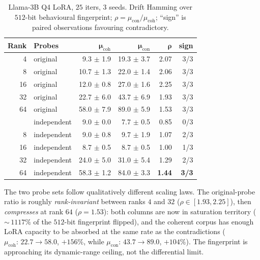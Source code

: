 \documentclass[11pt,a4paper]{article}
\begin{document}
\begin{table}[h]
\centering
\small
\caption{Llama\nobreakdash-3B Q4 LoRA, $25$ iters,
$3$ seeds.  Drift Hamming over $512$\nobreakdash-bit behavioural
fingerprint; $\rho = \mu_{\mathrm{con}}/\mu_{\mathrm{coh}}$;
``sign'' is paired observations favouring contradictory.}
\label{tab:poisoning:rank-sweep}
\begin{tabular}{r l r r r r}
\toprule
\textbf{Rank} & \textbf{Probes} & $\bm{\mu_{\mathrm{coh}}}$ & $\bm{\mu_{\mathrm{con}}}$ & $\bm{\rho}$ & \textbf{sign} \\
\midrule
 4 & original    &  9.3  $\pm$ 1.9 & 19.3 $\pm$ 3.7 & 2.07 & 3/3 \\
 8 & original    & 10.7  $\pm$ 1.3 & 22.0 $\pm$ 1.4 & 2.06 & 3/3 \\
16 & original    & 12.0  $\pm$ 0.8 & 27.0 $\pm$ 1.6 & 2.25 & 3/3 \\
32 & original    & 22.7  $\pm$ 6.0 & 43.7 $\pm$ 6.9 & 1.93 & 3/3 \\
64 & original    & 58.0  $\pm$ 7.9 & 89.0 $\pm$ 5.9 & 1.53 & 3/3 \\
\addlinespace
 4 & independent &  9.0  $\pm$ 0.0 &  7.7 $\pm$ 0.5 & 0.85 & 0/3 \\
 8 & independent &  9.0  $\pm$ 0.8 &  9.7 $\pm$ 1.9 & 1.07 & 2/3 \\
16 & independent &  8.7  $\pm$ 0.5 &  8.7 $\pm$ 0.5 & 1.00 & 1/3 \\
32 & independent & 24.0  $\pm$ 5.0 & 31.0 $\pm$ 5.4 & 1.29 & 2/3 \\
64 & independent & 58.3  $\pm$ 1.2 & 84.0 $\pm$ 3.3 & \textbf{1.44} & \textbf{3/3} \\
\bottomrule
\end{tabular}
\end{table}

The two probe sets follow qualitatively different scaling
laws.  The original\nobreakdash-probe ratio is roughly
\emph{rank\nobreakdash-invariant} between ranks $4$ and $32$
($\rho \in [1.93, 2.25]$), then \emph{compresses} at rank $64$
($\rho = 1.53$): both columns are now in saturation territory
(${\sim}\,11$\textendash$17\%$ of the $512$\nobreakdash-bit
fingerprint flipped), and the coherent corpus has enough LoRA
capacity to be absorbed at the same rate as the contradictions
($\mu_{\mathrm{coh}}{:}\,22.7 \!\to\! 58.0$,
$+156\%$, while $\mu_{\mathrm{con}}{:}\,43.7 \!\to\! 89.0$,
$+104\%$).  The fingerprint is approaching its dynamic\nobreakdash-range
ceiling, not the differential limit.
\end{document}
